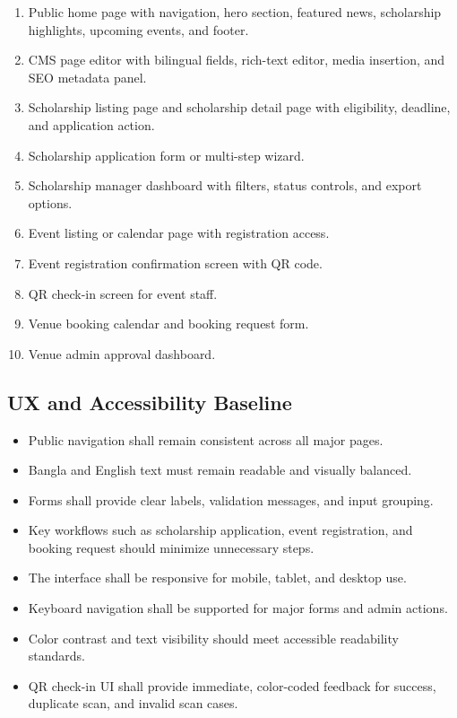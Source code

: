 \documentclass[12pt,a4paper]{article}
\begin{document}
\begin{enumerate}
\item Public home page with navigation, hero section, featured news, scholarship highlights, upcoming events, and footer.
\item CMS page editor with bilingual fields, rich-text editor, media insertion, and SEO metadata panel.
\item Scholarship listing page and scholarship detail page with eligibility, deadline, and application action.
\item Scholarship application form or multi-step wizard.
\item Scholarship manager dashboard with filters, status controls, and export options.
\item Event listing or calendar page with registration access.
\item Event registration confirmation screen with QR code.
\item QR check-in screen for event staff.
\item Venue booking calendar and booking request form.
\item Venue admin approval dashboard.
\end{enumerate}

\subsection{UX and Accessibility Baseline}

\begin{itemize}[nosep]
\item Public navigation shall remain consistent across all major pages.
\item Bangla and English text must remain readable and visually balanced.
\item Forms shall provide clear labels, validation messages, and input grouping.
\item Key workflows such as scholarship application, event registration, and booking request should minimize unnecessary steps.
\item The interface shall be responsive for mobile, tablet, and desktop use.
\item Keyboard navigation shall be supported for major forms and admin actions.
\item Color contrast and text visibility should meet accessible readability standards.
\item QR check-in UI shall provide immediate, color-coded feedback for success, duplicate scan, and invalid scan cases.
\end{itemize}
\end{document}
